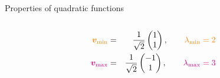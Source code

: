 \documentclass[11pt,compress,t,notes=noshow, xcolor=table]{beamer}
\begin{document}
\begin{frame}{Properties of quadratic functions}
\begin{columns}
\begin{column}{0.5\textwidth}
\begin{footnotesize}
  \begin{eqnarray*}
    \textcolor{orange}{\bm{v}_\text{min}} &=& \frac{1}{\sqrt{2}}\begin{pmatrix} 1 \\ 1 \end{pmatrix}, \qquad \textcolor{orange}{\lambda_\text{min} = 2} \\
    \textcolor{magenta}{\bm{v}_\text{max}} &=& \frac{1}{\sqrt{2}}\begin{pmatrix} - 1 \\ 1 \end{pmatrix}, \qquad \textcolor{magenta}{\lambda_\text{max} = 3}
  \end{eqnarray*}  
  
  \end{footnotesize}
  \end{column}
  
  \end{columns}
  
  
  
  \end{frame}
  
\end{document}
